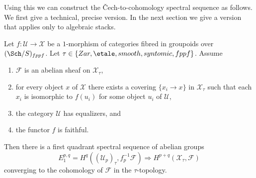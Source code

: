 \noindent
Using this we can construct the {\v C}ech-to-cohomology spectral sequence
as follows. We first give a technical, precise version. In the next section
we give a version that applies only to algebraic stacks.

\begin{lemma}
\label{lemma-cech-to-cohomology}
Let $f : \mathcal{U} \to \mathcal{X}$ be a $1$-morphism of categories fibred
in groupoids over $(\Sch/S)_{fppf}$. Let
$\tau \in \{Zar, \etale, smooth, syntomic, fppf\}$.
Assume
\begin{enumerate}
\item $\mathcal{F}$ is an abelian sheaf on $\mathcal{X}_\tau$,
\item for every object $x$ of $\mathcal{X}$ there exists a covering
$\{x_i \to x\}$ in $\mathcal{X}_\tau$ such that each $x_i$ is isomorphic
to $f(u_i)$ for some object $u_i$ of $\mathcal{U}$,
\item the category $\mathcal{U}$ has equalizers, and
\item the functor $f$ is faithful.
\end{enumerate}
Then there is a first quadrant spectral sequence of abelian groups
$$
E_1^{p, q} = H^q((\mathcal{U}_p)_\tau, f_p^{-1}\mathcal{F})
\Rightarrow
H^{p + q}(\mathcal{X}_\tau, \mathcal{F})
$$
converging to the cohomology of $\mathcal{F}$ in the $\tau$-topology.
\end{lemma}


